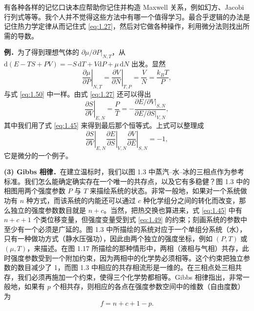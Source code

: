 有各种各样的记忆口诀本应帮助你记住并构造 Maxwell 关系，例如幻方、Jacobi 行列式等等。我个人并不觉得这些方法中有哪一个值得学习。最合乎逻辑的办法是记住热力学定律从而记住式 \eqref{eq:1.27}，然后对它做各种操作，利用微分法则找出所需的导数。

\textbf{例．}\quad 为了得到理想气体的 $\left.\partial\mu/\partial P\right|_{N,T}$，从 $\mathrm{d}(E-TS+PV)=-S\,\mathrm{d}T+V\mathrm{d}P+\mu\,\mathrm{d}N$ 出发。显然
\begin{equation}
\left.\frac{\partial\mu}{\partial P}\right|_{N,T}=\left.\frac{\partial V}{\partial N}\right|_{T,P}=\frac{V}{N}=\frac{k_BT}{P},
\label{eq:1.57}
\end{equation}
与式 \eqref{eq:1.50} 中一样。由式 \eqref{eq:1.27} 还可以得出
\begin{equation}
\left.\frac{\partial S}{\partial V}\right|_{E,N}=\frac{P}{T}=-\frac{\left.\partial E/\partial V\right|_{S,N}}{\left.\partial E/\partial S\right|_{V,N}},
\label{eq:1.58}
\end{equation}
其中我们用了式 \eqref{eq:1.45} 来得到最后那个恒等式。上式可以整理成
\begin{equation}
\left.\frac{\partial S}{\partial V}\right|_{E,N}\left.\frac{\partial E}{\partial S}\right|_{V,N}\left.\frac{\partial V}{\partial E}\right|_{S,N}=-1,
\label{eq:1.59}
\end{equation}
它是微分的一个例子。

\textbf{(3) Gibbs 相律．}\quad 在建立温标时，我们以图 1.3 中蒸汽--水--冰的三相点作为参考标准。我们怎么能确定确实存在一个唯一的共存点，以及它有多稳健？图 1.3 中的相图用两个强度参数 $P$ 与 $T$ 来描绘系统的状态。非常一般地，如果对一个系统做功有 $n$ 种方式，而该系统的内能还可以通过 $c$ 种化学组分之间的转化而改变，那么独立的强度参数数目就是 $n+c$。当然，把热交换也算进来，式 \eqref{eq:1.45} 中有 $n+c+1$ 个类位移变量，但强度变量受到式 \eqref{eq:1.49} 的约束；刻画系统的参数中至少有一个必须是广延的。图 1.3 中所描绘的系统对应于一个单组分系统（水），只有一种做功方式（静水压强功），因此由两个独立的强度坐标，例如 $(P,T)$ 或 $(\mu,T)$，来描述。在图 1.17 所描绘的那种情形中，两相（液相与气相）共存，此时强度参数受到一个附加约束，因为两相中的化学势必须相等。这个约束把独立参数的数目减少了 1，而图 1.3 中相应的共存相流形是一维的。在三相点处三相共存，我们必须再施加一个约束，使得三个化学势都相等。Gibbs 相律指出，非常一般地，如果有 $p$ 个相共存，则相应的各点在强度参数空间中的维数（自由度数）为
\begin{equation}
f=n+c+1-p.
\label{eq:1.60}
\end{equation}

